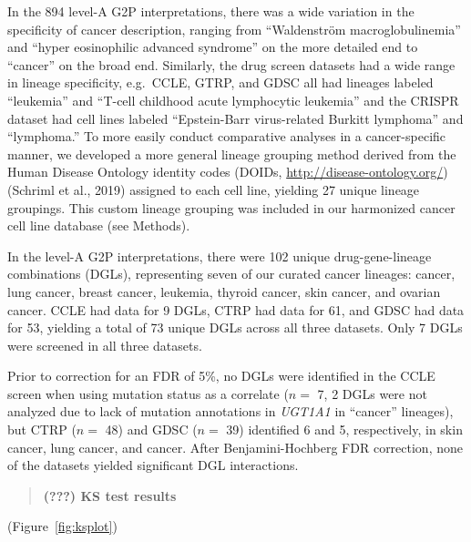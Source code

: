 \documentclass[man,floatsintext]{apa6}
\begin{document}
In the 894 level-A G2P interpretations, there was a wide variation in
the specificity of cancer description, ranging from \enquote{Waldenström
macroglobulinemia} and \enquote{hyper eosinophilic advanced syndrome} on
the more detailed end to \enquote{cancer} on the broad end. Similarly,
the drug screen datasets had a wide range in lineage specificity,
e.g.~CCLE, GTRP, and GDSC all had lineages labeled \enquote{leukemia}
and \enquote{T-cell childhood acute lymphocytic leukemia} and the CRISPR
dataset had cell lines labeled \enquote{Epstein-Barr virus-related
Burkitt lymphoma} and \enquote{lymphoma.} To more easily conduct
comparative analyses in a cancer-specific manner, we developed a more
general lineage grouping method derived from the Human Disease Ontology
identity codes (DOIDs, \url{http://disease-ontology.org/}) (Schriml et
al., 2019) assigned to each cell line, yielding 27 unique lineage
groupings. This custom lineage grouping was included in our harmonized
cancer cell line database (see Methods).

In the level-A G2P interpretations, there were 102 unique
drug-gene-lineage combinations (DGLs), representing seven of our curated
cancer lineages: cancer, lung cancer, breast cancer, leukemia, thyroid
cancer, skin cancer, and ovarian cancer. CCLE had data for 9 DGLs, CTRP
had data for 61, and GDSC had data for 53, yielding a total of 73 unique
DGLs across all three datasets. Only 7 DGLs were screened in all three
datasets.

Prior to correction for an FDR of 5\%, no DGLs were identified in the
CCLE screen when using mutation status as a correlate (\(n =\) 7, 2 DGLs
were not analyzed due to lack of mutation annotations in \emph{UGT1A1}
in \enquote{cancer} lineages), but CTRP (\(n =\) 48) and GDSC (\(n =\)
39) identified 6 and 5, respectively, in skin cancer, lung cancer, and
cancer. After Benjamini-Hochberg FDR correction, none of the datasets
yielded significant DGL interactions.

\begin{quote}
\textbf{(???) KS test results}
\end{quote}

(Figure~\ref{fig:ksplot})
\end{document}
